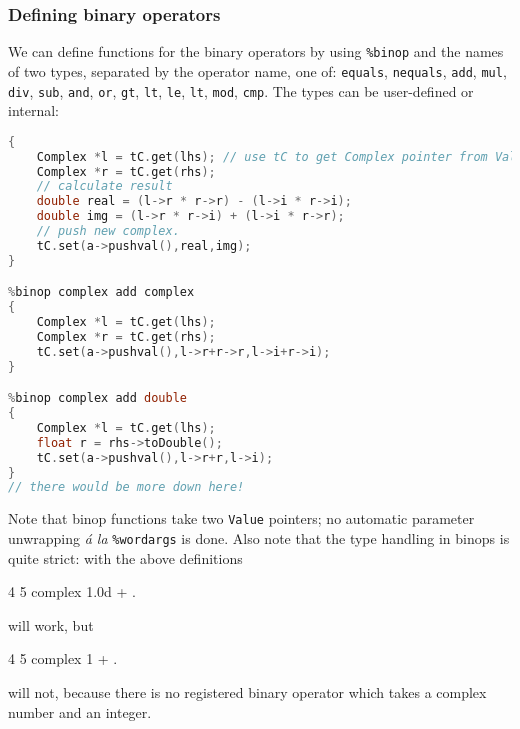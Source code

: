 \subsubsection{Defining binary operators}
We can define functions for the binary operators by using
\texttt{\%binop} and the names of two types, separated by the operator
name, one of: \texttt{equals}, \texttt{nequals}, \texttt{add}, \texttt{mul},
\texttt{div}, \texttt{sub}, \texttt{and}, \texttt{or}, \texttt{gt}, 
\texttt{lt}, \texttt{le}, \texttt{lt}, \texttt{mod}, \texttt{cmp}. 
The types can be user-defined or internal:
\begin{lstlisting}[language=c++]
%binop complex mul complex
{
    Complex *l = tC.get(lhs); // use tC to get Complex pointer from Value
    Complex *r = tC.get(rhs);
    // calculate result
    double real = (l->r * r->r) - (l->i * r->i);
    double img = (l->r * r->i) + (l->i * r->r);
    // push new complex.
    tC.set(a->pushval(),real,img);
}

%binop complex add complex
{
    Complex *l = tC.get(lhs);
    Complex *r = tC.get(rhs);
    tC.set(a->pushval(),l->r+r->r,l->i+r->i);
}

%binop complex add double
{
    Complex *l = tC.get(lhs);
    float r = rhs->toDouble();
    tC.set(a->pushval(),l->r+r,l->i);
}
// there would be more down here!
\end{lstlisting}
Note that binop functions take two \texttt{Value} pointers; no
automatic parameter unwrapping \emph{\'a la} \texttt{\%wordargs} is
done. Also note that the type handling in binops is quite strict:
with the above definitions
\begin{v}
4 5 complex 1.0d + .
\end{v}
will work, but
\begin{v}
4 5 complex 1 + .
\end{v}
will not, because there is no registered binary operator which
takes a complex number and an integer.

